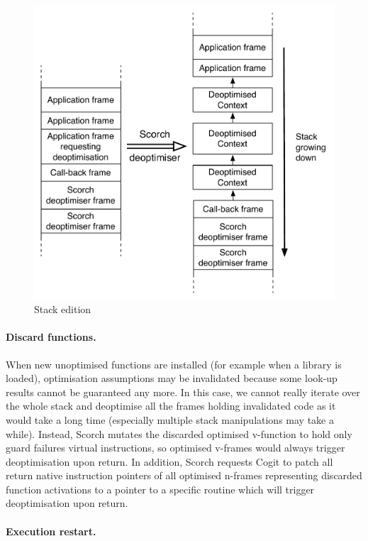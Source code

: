 \documentclass[a4paper,12pt,twoside]{../includes/ThesisStyle}
\begin{document}
\begin{figure}[h!]
    \begin{center}
		\includegraphics[width=0.80\linewidth]{DeoptStacks}
        \caption{Stack edition}
        \label{fig:DeoptStacks}
    \end{center}
\end{figure}

\paragraph{Discard functions.} When new unoptimised functions are installed (for example when a library is loaded), optimisation assumptions may be invalidated because some look-up results cannot be guaranteed any more. In this case, we cannot really iterate over the whole stack and deoptimise all the frames holding invalidated code as it would take a long time (especially multiple stack manipulations may take a while). Instead, Scorch mutates the discarded optimised v-function to hold only guard failures virtual instructions, so optimised v-frames would always trigger deoptimisation upon return. In addition, Scorch requests Cogit to patch all return native instruction pointers of all optimised n-frames representing discarded function activations to a pointer to a specific routine which will trigger deoptimisation upon return.

\paragraph{Execution restart.}
\end{document}
